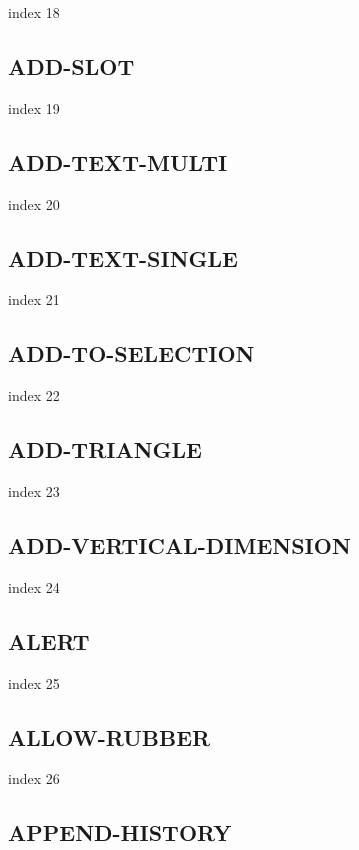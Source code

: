 \documentclass[a4paper]{report}
\begin{document}
index 18

\subsection{ADD-SLOT}

index 19

\subsection{ADD-TEXT-MULTI}

index 20

\subsection{ADD-TEXT-SINGLE}

index 21

\subsection{ADD-TO-SELECTION}

index 22

\subsection{ADD-TRIANGLE}

index 23

\subsection{ADD-VERTICAL-DIMENSION}

index 24

\subsection{ALERT}

index 25

\subsection{ALLOW-RUBBER}

index 26

\subsection{APPEND-HISTORY}
\end{document}

